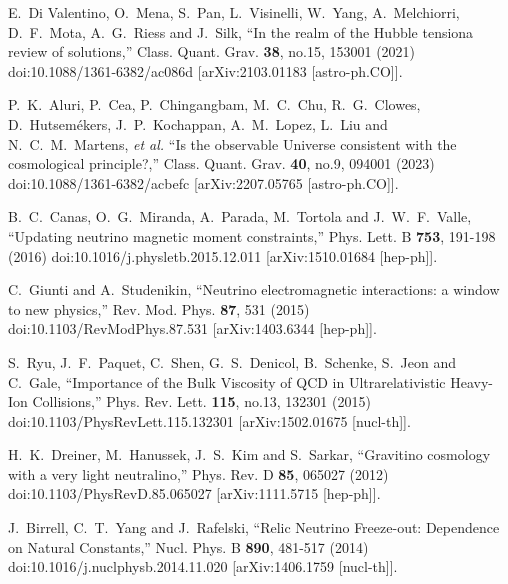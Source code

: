 \documentclass[universe,article,submit,moreauthors,pdftex,a4paper]{Definitions/mdpi}
\begin{document}
\begin{thebibliography}{99}
E.~Di Valentino, O.~Mena, S.~Pan, L.~Visinelli, W.~Yang, A.~Melchiorri, D.~F.~Mota, A.~G.~Riess and J.~Silk,
``In the realm of the Hubble tension\textemdash{}a review of solutions,''
Class. Quant. Grav. \textbf{38}, no.15, 153001 (2021)
doi:10.1088/1361-6382/ac086d
[arXiv:2103.01183 [astro-ph.CO]].

P.~K.~Aluri, P.~Cea, P.~Chingangbam, M.~C.~Chu, R.~G.~Clowes, D.~Hutsem\'ekers, J.~P.~Kochappan, A.~M.~Lopez, L.~Liu and N.~C.~M.~Martens, \textit{et al.}
``Is the observable Universe consistent with the cosmological principle?,''
Class. Quant. Grav. \textbf{40}, no.9, 094001 (2023)
doi:10.1088/1361-6382/acbefc
[arXiv:2207.05765 [astro-ph.CO]].

B.~C.~Canas, O.~G.~Miranda, A.~Parada, M.~Tortola and J.~W.~F.~Valle,
``Updating neutrino magnetic moment constraints,''
Phys. Lett. B \textbf{753}, 191-198 (2016)
doi:10.1016/j.physletb.2015.12.011
[arXiv:1510.01684 [hep-ph]].

C.~Giunti and A.~Studenikin,
``Neutrino electromagnetic interactions: a window to new physics,''
Rev. Mod. Phys. \textbf{87}, 531 (2015)
doi:10.1103/RevModPhys.87.531
[arXiv:1403.6344 [hep-ph]].

S.~Ryu, J.~F.~Paquet, C.~Shen, G.~S.~Denicol, B.~Schenke, S.~Jeon and C.~Gale,
``Importance of the Bulk Viscosity of QCD in Ultrarelativistic Heavy-Ion Collisions,''
Phys. Rev. Lett. \textbf{115}, no.13, 132301 (2015)
doi:10.1103/PhysRevLett.115.132301
[arXiv:1502.01675 [nucl-th]].

H.~K.~Dreiner, M.~Hanussek, J.~S.~Kim and S.~Sarkar,
``Gravitino cosmology with a very light neutralino,''
Phys. Rev. D \textbf{85}, 065027 (2012)
doi:10.1103/PhysRevD.85.065027
[arXiv:1111.5715 [hep-ph]].

J.~Birrell, C.~T.~Yang and J.~Rafelski,
``Relic Neutrino Freeze-out: Dependence on Natural Constants,''
Nucl. Phys. B \textbf{890}, 481-517 (2014)
doi:10.1016/j.nuclphysb.2014.11.020
[arXiv:1406.1759 [nucl-th]].


\end{thebibliography}
\end{document}
